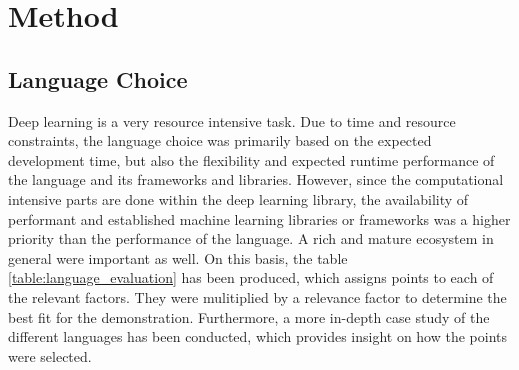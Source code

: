 \documentclass[12pt, a4paper, titlepage]{report}
\begin{document}



\chapter{Method}

\section{Language Choice}  %

Deep learning is a very resource intensive task. Due to time and resource constraints, the language choice was primarily based on the expected development time, but also the flexibility and expected runtime performance of the language and its frameworks and libraries. However, since the computational intensive parts are done within the deep learning library, the availability of performant and established machine learning libraries or frameworks was a higher priority than the performance of the language. A rich and mature ecosystem in general were important as well. On this basis, the table \ref{table:language_evaluation} has been produced, which assigns points to each of the relevant factors. They were mulitiplied by a relevance factor to determine the best fit for the demonstration.
Furthermore, a more in-depth case study of the different languages has been conducted, which provides insight on how the points were selected.
\end{document}
